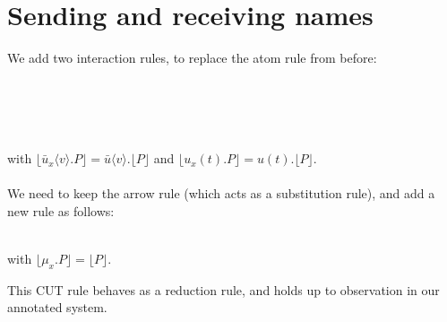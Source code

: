\documentclass[a4paper,12pt]{article}
\begin{document}
\section{Sending and receiving names}
We add two interaction rules, to replace the atom rule from before:\\~\\
\indent\hfill\begin{prooftree}
\end{prooftree}\hfill
\begin{prooftree}
\end{prooftree}\hfill~\\~\\~\\
with $\lfloor \bar{u}_x\langle v\rangle.P \rfloor = \bar{u}\langle v\rangle.\lfloor P\rfloor$ and $\lfloor u_x(t).P \rfloor = u(t).\lfloor P \rfloor$.\\~\\
We need to keep the arrow rule (which acts as a substitution rule), and add a new rule as follows:\\~\\
\indent\hfill\begin{prooftree}
\end{prooftree}\hfill with $\lfloor \mu_x.P \rfloor = \lfloor P \rfloor$.\hfill~\\
\begin{proposition}
This CUT rule behaves as a reduction rule, and holds up to observation in our annotated system.
\end{proposition}
\end{document}
